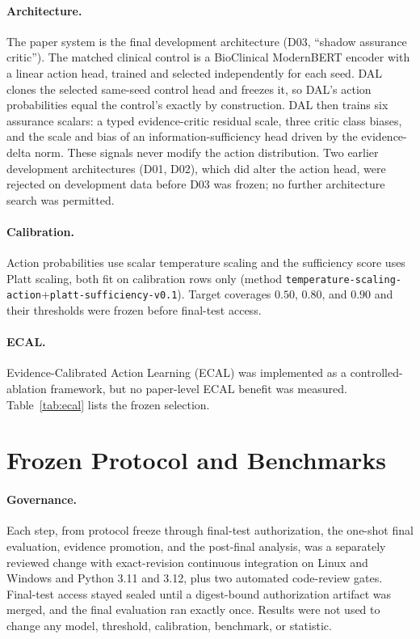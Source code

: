 \documentclass[11pt]{article}
\begin{document}
\paragraph{Architecture.}
The paper system is the final development architecture (D03, ``shadow assurance critic''). The matched
clinical control is a BioClinical ModernBERT encoder with a linear action head, trained and selected
independently for each seed. DAL clones the selected same-seed control head and freezes it, so DAL's
action probabilities equal the control's exactly by construction. DAL then trains six assurance
scalars: a typed evidence-critic residual scale, three critic class biases, and the scale and bias of an
information-sufficiency head driven by the evidence-delta norm. These signals never modify the action
distribution. Two earlier development architectures (D01, D02), which did alter the action head, were
rejected on development data before D03 was frozen; no further architecture search was permitted.

\paragraph{Calibration.}
Action probabilities use scalar temperature scaling and the sufficiency score uses Platt scaling, both
fit on calibration rows only (method \texttt{temperature-scaling-action}+\allowbreak\texttt{platt-sufficiency-v0.1}). Target
coverages $0.50$, $0.80$, and $0.90$ and their thresholds were frozen before final-test access.

\paragraph{ECAL.}
Evidence-Calibrated Action Learning (ECAL) was implemented as a controlled-ablation framework, but no
paper-level ECAL benefit was measured.  Table~\ref{tab:ecal} lists the frozen selection.

\section{Frozen Protocol and Benchmarks}
\label{sec:protocol}

\paragraph{Governance.}
Each step, from protocol freeze through final-test authorization, the one-shot final evaluation,
evidence promotion, and the post-final analysis, was a separately reviewed change with exact-revision
continuous integration on Linux and Windows and Python 3.11 and 3.12, plus two automated
code-review gates. Final-test access stayed sealed until a digest-bound authorization artifact was merged,
and the final evaluation ran exactly once. Results were not used to change any model, threshold,
calibration, benchmark, or statistic.
\end{document}
